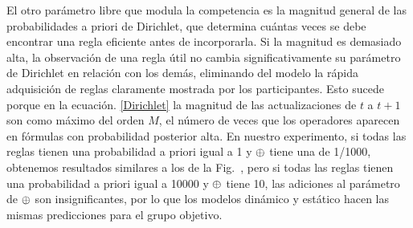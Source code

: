 El otro parámetro libre que modula la competencia es la magnitud general de las probabilidades a priori de Dirichlet, que determina cuántas veces se debe encontrar una regla eficiente antes de incorporarla. Si la magnitud es demasiado alta, la observación de una regla útil no cambia significativamente su parámetro de Dirichlet en relación con los demás, eliminando del modelo la rápida adquisición de reglas claramente mostrada por los participantes. Esto sucede porque en la ecuación. \eqref{Dirichlet} la magnitud de las actualizaciones de $ t $ a $ t + 1 $ son como máximo del orden $ M $, el número de veces que los operadores aparecen en fórmulas con probabilidad posterior alta. En nuestro experimento, si todas las reglas tienen una probabilidad a priori igual a 1 y $ \oplus $ tiene una de 1/1000, obtenemos resultados similares a los de la Fig.~, pero si todas las reglas tienen una probabilidad a priori igual a 10000 y $ \oplus $ tiene 10, las adiciones al parámetro de $ \oplus $ son insignificantes, por lo que los modelos dinámico y estático hacen las mismas predicciones para el grupo objetivo.

